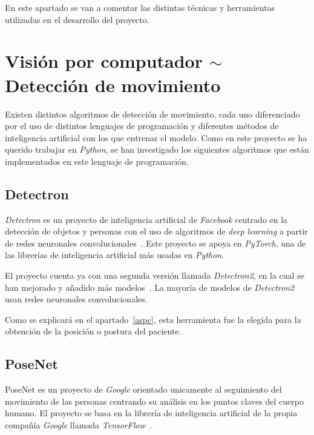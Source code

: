 
En este apartado se van a comentar las distintas técnicas y herramientas utilizadas en el desarrollo del proyecto.

\section{Visión por computador $\sim$ Detección de movimiento}
Existen distintos algoritmos de detección de movimiento, cada uno diferenciado por el uso de distintos lenguajes de programación y diferentes métodos de inteligencia artificial con los que entrenar el modelo. Como en este proyecto se ha querido trabajar en \textit{Python}, se han investigado los siguientes algoritmos que están implementados en este lenguaje de programación. 

\subsection{Detectron}\label{dectectron}
\textit{Detectron} es un proyecto de inteligencia artificial de \textit{Facebook} centrado en la detección de objetos y personas con el uso de algoritmos de \textit{deep learning} a partir de redes neuronales convolucionales~\cite{Detectron2018}. Este proyecto se apoya en \textit{PyTorch}, una de las librerías de inteligencia artificial más usadas en \textit{Python}.

El proyecto cuenta ya con una segunda versión llamada \textit{Detectron2}, en la cual se han mejorado y añadido más modelos~\cite{wu2019detectron2}. La mayoría de modelos de \textit{Detectron2} usan redes neuronales convolucionales.

Como se explicará en el apartado~\ref{aspc}, esta herramienta fue la elegida para la obtención de la posición o postura del paciente.


\subsection{PoseNet}
PoseNet es un proyecto de \textit{Google} orientado unicamente al seguimiento del movimiento de las personas centrando su análisis en los puntos claves del cuerpo humano. El proyecto se basa en la librería de inteligencia artificial de la propia compañía \textit{Google} llamada \textit{TensorFlow}~\cite{tensorflow2015-whitepaper}.


